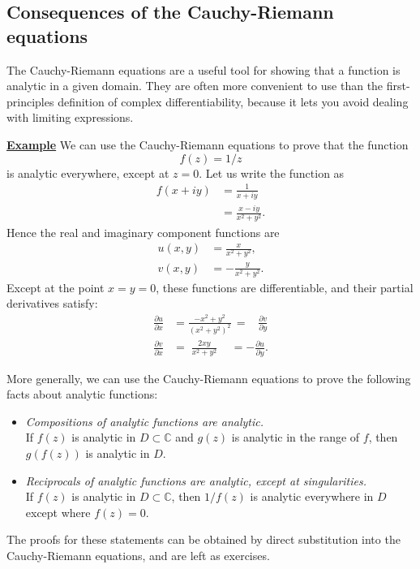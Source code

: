 \documentclass[10pt,a4paper]{article}
\begin{document}
\subsection{Consequences of the Cauchy-Riemann equations}
\label{consequences-of-the-cauchy-riemann-equations}

The Cauchy-Riemann equations are a useful tool for showing that a
function is analytic in a given domain. They are often more convenient
to use than the first-principles definition of complex
differentiability, because it lets you avoid dealing with limiting
expressions.

\begin{framed}
\noindent
\underline{\textbf{Example}}
\vskip 0.1in \noindent
We can use the Cauchy-Riemann equations to prove that the function
\begin{equation}
  f(z)=1/z
\end{equation}
is analytic everywhere, except at $z = 0$. Let us write the function
as
\begin{align}
  f(x+iy) &= \frac{1}{x+iy} \\ &= \frac{x-iy}{x^2+y^2}.
\end{align}
Hence the real and imaginary component functions are
\begin{align}
  u(x,y) &= \frac{x}{x^2+y^2}, \\
  v(x,y) &= - \frac{y}{x^2+y^2}.
\end{align}
Except at the point $x = y = 0$, these functions are differentiable,
and their partial derivatives satisfy:
\begin{align}
  \frac{\partial u}{\partial x} &= \frac{-x^2+y^2}{(x^2+y^2)^2}
  \,= \;\;\;\frac{\partial v}{\partial y}
  \\ \frac{\partial v}{\partial x} &= \; \frac{2xy}{x^2+y^2}
  \quad\,= -\frac{\partial u}{\partial y}.
\end{align}
\end{framed}

More generally, we can use the Cauchy-Riemann equations to prove the
following facts about analytic functions:
\begin{itemize}
\item
  \emph{Compositions of analytic functions are analytic.} \\If $f(z)$ is
  analytic in $D \subset \mathbb{C}$ and $g(z)$ is analytic in the
  range of $f$, then $g(f(z))$ is analytic in $D$.
\item
  \emph{Reciprocals of analytic functions are analytic, except at
    singularities.} \\ If $f(z)$ is analytic in $D \subset \mathbb{C}$,
  then $1/f(z)$ is analytic everywhere in $D$ except where $f(z) = 0$.
\end{itemize}
\noindent
The proofs for these statements can be obtained by direct substitution
into the Cauchy-Riemann equations, and are left as exercises.
\end{document}

